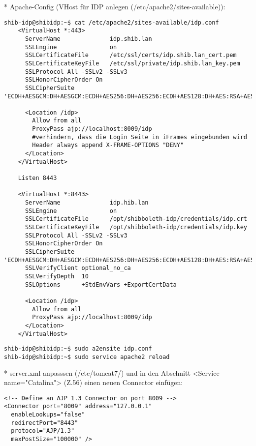 * Apache-Config (VHost für IDP anlegen (/etc/apache2/sites-available)):
\begin{lstlisting}
shib-idp@shibidp:~$ cat /etc/apache2/sites-available/idp.conf
	<VirtualHost *:443>
	  ServerName              idp.shib.lan
	  SSLEngine               on
	  SSLCertificateFile      /etc/ssl/certs/idp.shib.lan_cert.pem
	  SSLCertificateKeyFile   /etc/ssl/private/idp.shib.lan_key.pem
	  SSLProtocol All -SSLv2 -SSLv3
	  SSLHonorCipherOrder On
	  SSLCipherSuite 'ECDH+AESGCM:DH+AESGCM:ECDH+AES256:DH+AES256:ECDH+AES128:DH+AES:RSA+AESGCM:RSA+AES:ECDH+3DES:DH+3DES:RSA+3DES:!aNULL:!eNULL:!LOW:!RC4:!MD5:!EXP:!PSK:!DSS:!SEED:!ECDSA:!CAMELLIA'

	  <Location /idp>
		Allow from all
		ProxyPass ajp://localhost:8009/idp
		#verhindern, dass die Login Seite in iFrames eingebunden wird
		Header always append X-FRAME-OPTIONS "DENY"
	  </Location>
	</VirtualHost>

	Listen 8443

	<VirtualHost *:8443>
	  ServerName              idp.hib.lan
	  SSLEngine               on
	  SSLCertificateFile      /opt/shibboleth-idp/credentials/idp.crt
	  SSLCertificateKeyFile   /opt/shibboleth-idp/credentials/idp.key
	  SSLProtocol All -SSLv2 -SSLv3
	  SSLHonorCipherOrder On
	  SSLCipherSuite 'ECDH+AESGCM:DH+AESGCM:ECDH+AES256:DH+AES256:ECDH+AES128:DH+AES:RSA+AESGCM:RSA+AES:ECDH+3DES:DH+3DES:RSA+3DES:!aNULL:!eNULL:!LOW:!RC4:!MD5:!EXP:!PSK:!DSS:!SEED:!ECDSA:!CAMELLIA'
	  SSLVerifyClient optional_no_ca
	  SSLVerifyDepth  10
	  SSLOptions      +StdEnvVars +ExportCertData

	  <Location /idp>
		Allow from all
		ProxyPass ajp://localhost:8009/idp
	  </Location>
	</VirtualHost>
\end{lstlisting}
\begin{lstlisting}
shib-idp@shibidp:~$ sudo a2ensite idp.conf
shib-idp@shibidp:~$ sudo service apache2 reload
\end{lstlisting}
* server.xml anpasssen (/etc/tomcat7/) und in den Abschnitt <Service name="Catalina"> (Z.56) einen neuen Connector einfügen:
\begin{lstlisting}
<!-- Define an AJP 1.3 Connector on port 8009 -->
<Connector port="8009" address="127.0.0.1"
  enableLookups="false"
  redirectPort="8443"
  protocol="AJP/1.3"
  maxPostSize="100000" />
\end{lstlisting}

